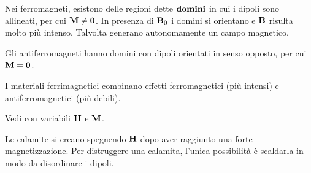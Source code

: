 Nei ferromagneti, esistono delle regioni dette $\textbf{domini}$ in cui i dipoli sono allineati, per cui $\mathbf{M} \ne \mathbf{0}$.
In presenza di $\mathbf{B}_0$ i domini si orientano e $\mathbf{B}$ risulta molto più intenso.
Talvolta generano autonomamente un campo magnetico.

Gli antiferromagneti hanno domini con dipoli orientati in senso opposto, per cui $\mathbf{M} = \mathbf{0}$.

I materiali ferrimagnetici combinano effetti ferromagnetici (più intensi) e antiferromagnetici (più debili).

Vedi  con variabili $\mathbf{H}$ e $\mathbf{M}$.

Le calamite si creano spegnendo $\mathbf{H}$ dopo aver raggiunto una forte magnetizzazione.
Per distruggere una calamita, l'unica possibilità è scaldarla in modo da disordinare i dipoli.
